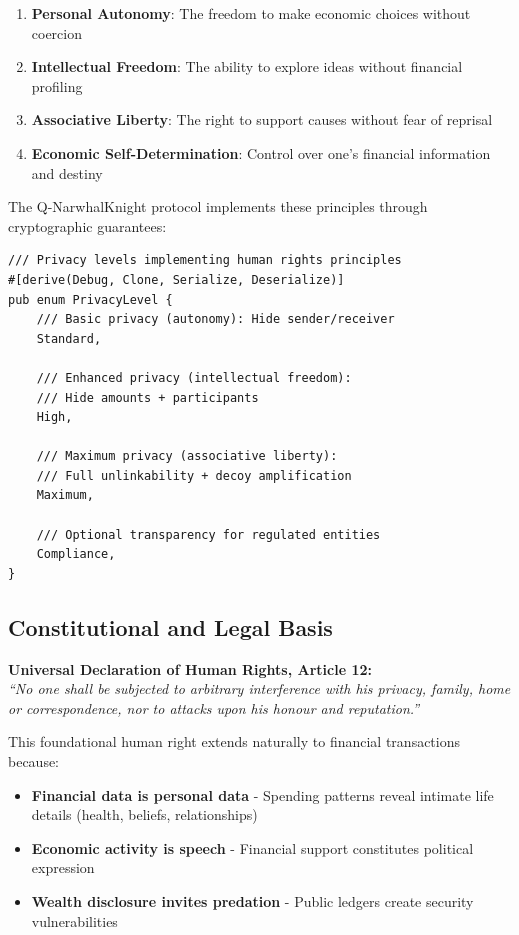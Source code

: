 \documentclass[12pt,a4paper]{article}
\begin{document}
\begin{enumerate}
\item \textbf{Personal Autonomy}: The freedom to make economic choices without coercion
\item \textbf{Intellectual Freedom}: The ability to explore ideas without financial profiling
\item \textbf{Associative Liberty}: The right to support causes without fear of reprisal
\item \textbf{Economic Self-Determination}: Control over one's financial information and destiny
\end{enumerate}

The Q-NarwhalKnight protocol implements these principles through cryptographic guarantees:

\begin{lstlisting}[style=rustcode, caption=Privacy as Code - Fundamental Design]
/// Privacy levels implementing human rights principles
#[derive(Debug, Clone, Serialize, Deserialize)]
pub enum PrivacyLevel {
    /// Basic privacy (autonomy): Hide sender/receiver
    Standard,

    /// Enhanced privacy (intellectual freedom):
    /// Hide amounts + participants
    High,

    /// Maximum privacy (associative liberty):
    /// Full unlinkability + decoy amplification
    Maximum,

    /// Optional transparency for regulated entities
    Compliance,
}
\end{lstlisting}

\subsection{Constitutional and Legal Basis}

\textbf{Universal Declaration of Human Rights, Article 12:}\\
\textit{``No one shall be subjected to arbitrary interference with his privacy, family, home or correspondence, nor to attacks upon his honour and reputation.''}

This foundational human right extends naturally to financial transactions because:

\begin{itemize}
\item \textbf{Financial data is personal data} - Spending patterns reveal intimate life details (health, beliefs, relationships)
\item \textbf{Economic activity is speech} - Financial support constitutes political expression
\item \textbf{Wealth disclosure invites predation} - Public ledgers create security vulnerabilities
\end{itemize}
\end{document}
